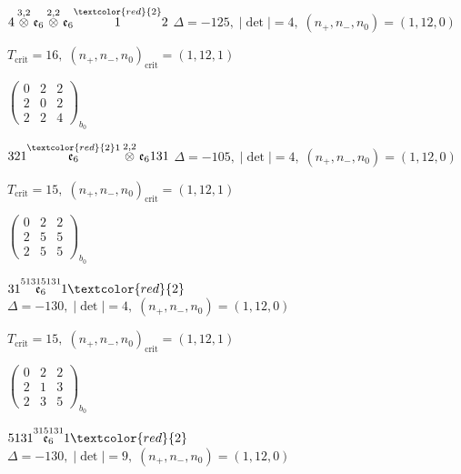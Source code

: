 \documentclass[10pt]{article}
\begin{document}
$4\overset{3,2}{\otimes}\mathfrak{e}_6\overset{2,2}{\otimes}\mathfrak{e}_6\overset{\textcolor{red}{2}}{1}2$ \quad $\Delta=-125,\; |\det|=4,\; (n_+,n_-,n_0)=(1,12,0)$

\hspace{1em}$T_{\text{crit}}=16,\; (n_+,n_-,n_0)_{\text{crit}}=(1,12,1)$

\hspace{2em}$\left(\begin{smallmatrix}0 & 2 & 2 \\ 2 & 0 & 2 \\ 2 & 2 & 4\end{smallmatrix}\right)_{\!b_0}$

\smallskip

$321\overset{\textcolor{red}{2}1}{\mathfrak{e}_6}\overset{2,2}{\otimes}\mathfrak{e}_6131$ \quad $\Delta=-105,\; |\det|=4,\; (n_+,n_-,n_0)=(1,12,0)$

\hspace{1em}$T_{\text{crit}}=15,\; (n_+,n_-,n_0)_{\text{crit}}=(1,12,1)$

\hspace{2em}$\left(\begin{smallmatrix}0 & 2 & 2 \\ 2 & 5 & 5 \\ 2 & 5 & 5\end{smallmatrix}\right)_{\!b_0}$

\smallskip

$31\overset{51315131}{\mathfrak{e}_6}1\textcolor{red}{2}$ \quad $\Delta=-130,\; |\det|=4,\; (n_+,n_-,n_0)=(1,12,0)$

\hspace{1em}$T_{\text{crit}}=15,\; (n_+,n_-,n_0)_{\text{crit}}=(1,12,1)$

\hspace{2em}$\left(\begin{smallmatrix}0 & 2 & 2 \\ 2 & 1 & 3 \\ 2 & 3 & 5\end{smallmatrix}\right)_{\!b_0}$

\smallskip

$5131\overset{315131}{\mathfrak{e}_6}1\textcolor{red}{2}$ \quad $\Delta=-130,\; |\det|=9,\; (n_+,n_-,n_0)=(1,12,0)$
\end{document}

